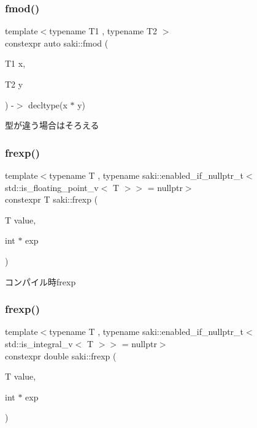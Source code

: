 \subsubsection{\texorpdfstring{fmod()}{fmod()}\hspace{0.1cm}{\footnotesize\ttfamily [2/2]}}
{\footnotesize\ttfamily template$<$typename T1 , typename T2 $>$ \\
constexpr auto saki\+::fmod (\begin{DoxyParamCaption}\item[{T1}]{x,  }\item[{T2}]{y }\end{DoxyParamCaption}) -\/$>$ decltype(x $\ast$ y)
	}



型が違う場合はそろえる 

\mbox{\label{namespacesaki_a00438d1cd099cfd0e2938f9e3defd283}} 
\subsubsection{\texorpdfstring{frexp()}{frexp()}\hspace{0.1cm}{\footnotesize\ttfamily [1/2]}}
{\footnotesize\ttfamily template$<$typename T , typename saki\+::enabled\+\_\+if\+\_\+nullptr\+\_\+t$<$ std\+::is\+\_\+floating\+\_\+point\+\_\+v$<$ T $>$$>$  = nullptr$>$ \\
constexpr T saki\+::frexp (\begin{DoxyParamCaption}\item[{T}]{value,  }\item[{int $\ast$}]{exp }\end{DoxyParamCaption})}



コンパイル時frexp 

\mbox{\label{namespacesaki_a915bdd850c89e1ed06c5087790109f11}} 
\subsubsection{\texorpdfstring{frexp()}{frexp()}\hspace{0.1cm}{\footnotesize\ttfamily [2/2]}}
{\footnotesize\ttfamily template$<$typename T , typename saki\+::enabled\+\_\+if\+\_\+nullptr\+\_\+t$<$ std\+::is\+\_\+integral\+\_\+v$<$ T $>$$>$  = nullptr$>$ \\
constexpr double saki\+::frexp (\begin{DoxyParamCaption}\item[{T}]{value,  }\item[{int $\ast$}]{exp }\end{DoxyParamCaption})}



